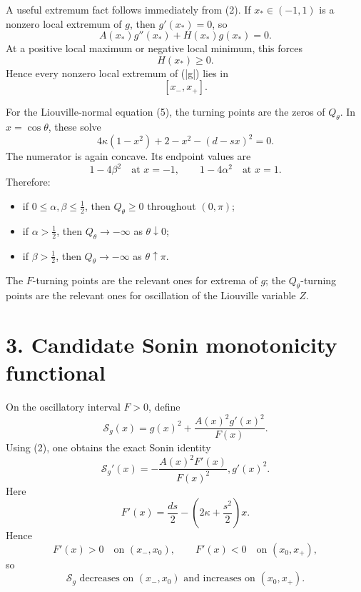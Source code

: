 \documentclass[11pt]{article}
\begin{document}
A useful extremum fact follows immediately from (2). If \(x_*\in(-1,1)\) is a nonzero local extremum of \(g\), then \(g'(x_*)=0\), so
\begin{equation*}
A(x_*)g''(x_*)+H(x_*)g(x_*)=0.
\end{equation*}
At a positive local maximum or negative local minimum, this forces
\begin{equation*}
H(x_*)\ge 0.
\end{equation*}
Hence every nonzero local extremum of (|g|) lies in
\begin{equation*}
\boxed{
[x_-,x_+].
}
\end{equation*}

For the Liouville-normal equation (5), the turning points are the zeros of \(Q_\theta\). In \(x=\cos\theta\), these solve
\begin{equation}
\boxed{
4\kappa(1-x^2)+2-x^2-(d-sx)^2=0.
}
\tag{10}
\end{equation}
The numerator is again concave. Its endpoint values are
\begin{equation*}
1-4\beta^2\quad\text{at }x=-1,
\qquad
1-4\alpha^2\quad\text{at }x=1.
\end{equation*}
Therefore:

\begin{itemize}
\item if \(0\le \alpha,\beta\le \tfrac12\), then \(Q_\theta\ge0\) throughout \((0,\pi)\);
\item if \(\alpha>\tfrac12\), then \(Q_\theta\to-\infty\) as \(\theta\downarrow0\);
\item if \(\beta>\tfrac12\), then \(Q_\theta\to-\infty\) as \(\theta\uparrow\pi\).
\end{itemize}
The \(F\)-turning points are the relevant ones for extrema of \(g\); the \(Q_\theta\)-turning points are the relevant ones for oscillation of the Liouville variable \(Z\).

\section*{3. Candidate Sonin monotonicity functional}

On the oscillatory interval \(F>0\), define
\begin{equation}
\boxed{
\mathcal S_g(x)
=
g(x)^2+\frac{A(x)^2g'(x)^2}{F(x)}.
}
\tag{11}
\end{equation}
Using (2), one obtains the exact Sonin identity
\begin{equation}
\boxed{
\mathcal S_g'(x)
=
-\frac{A(x)^2F'(x)}{F(x)^2},g'(x)^2.
}
\tag{12}
\end{equation}
Here
\begin{equation*}
F'(x)=\frac{ds}{2}-\left(2\kappa+\frac{s^2}{2}\right)x.
\end{equation*}
Hence
\begin{equation*}
F'(x)>0\quad\text{on }(x_-,x_0),
\qquad
F'(x)<0\quad\text{on }(x_0,x_+),
\end{equation*}
so
\begin{equation}
\boxed{
\mathcal S_g \text{ decreases on }(x_-,x_0)
\text{ and increases on }(x_0,x_+).
}
\tag{13}
\end{equation}
\end{document}

